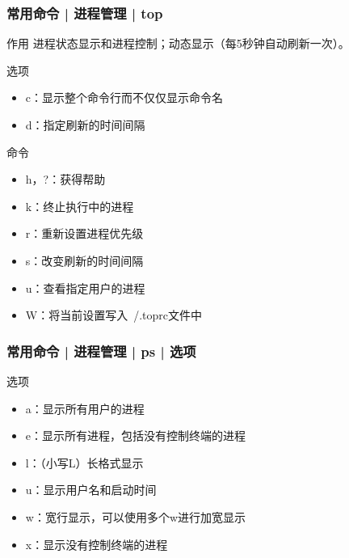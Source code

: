 \begin{frame}
  \frametitle{常用命令 | 进程管理 | top}
  \begin{block}{作用}
    进程状态显示和进程控制；动态显示（每5秒钟自动刷新一次）。
  \end{block}
  \pause
  \begin{block}{选项}
    \begin{itemize}
      \item c：显示整个命令行而不仅仅显示命令名
      \item d：指定刷新的时间间隔
    \end{itemize}
  \end{block}
  \pause
  \begin{block}{命令}
    \begin{itemize}
      \item h，?：获得帮助
      \item k：终止执行中的进程
      \item r：重新设置进程优先级
      \item s：改变刷新的时间间隔
      \item u：查看指定用户的进程
      \item W：将当前设置写入~/.toprc文件中
    \end{itemize}
  \end{block}
\end{frame}

\begin{frame}
  \frametitle{常用命令 | 进程管理 | ps | 选项}
  \begin{block}{选项}
    \begin{itemize}
      \item a：显示所有用户的进程
      \item e：显示所有进程，包括没有控制终端的进程
      \item l：（小写L）长格式显示
      \item u：显示用户名和启动时间
      \item w：宽行显示，可以使用多个w进行加宽显示
      \item x：显示没有控制终端的进程
    \end{itemize}
  \end{block}
\end{frame}

